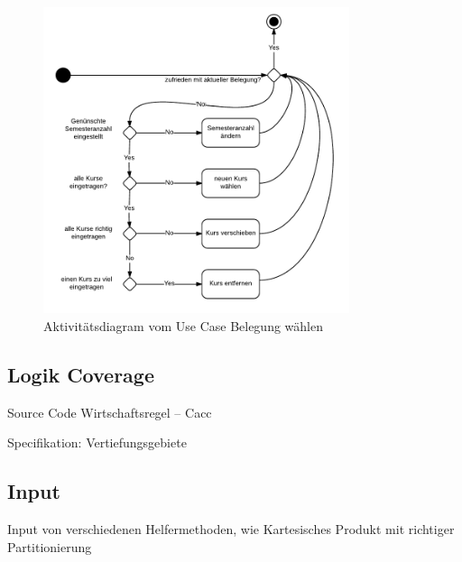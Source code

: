 \documentclass[ngerman]{article}
\begin{document}
\begin{figure}

\includegraphics[width=0.8\textwidth]{figures/180_Belegungaendern_aktivitaet.pdf}
\caption{Aktivitätsdiagram vom Use Case Belegung wählen}
\end{figure}

\subsection{Logik Coverage}
Source Code
Wirtschaftsregel -- Cacc

Specifikation: Vertiefungsgebiete


\subsection{Input}
Input von verschiedenen Helfermethoden, wie Kartesisches Produkt mit richtiger Partitionierung
\end{document}
